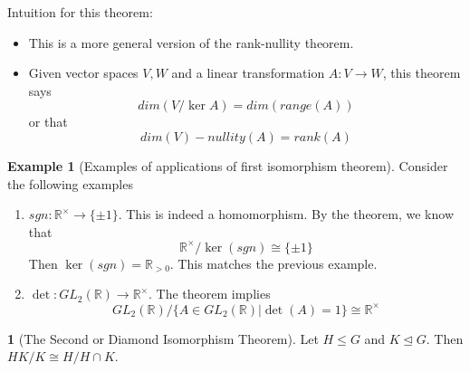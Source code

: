 \documentclass[12pt]{article}
\theoremstyle{definition}
\newtheorem{theorem}{\color{ForestGreen}{\textbf{Theorem}}}
\newcommand{\R}{\mathbb{R}}
\newtheorem{example}{\color{WildStrawberry}Example}
\theoremstyle{definition}
\begin{document}
Intuition for this theorem:
\begin{itemize}
	\item This is a more general version of the rank-nullity theorem.
	\item Given vector spaces $V, W$ and a linear transformation $A : V \to W$, this theorem says
	\begin{equation}
		dim( V / \ker A ) = dim (range(A))
	\end{equation}
	or that
	\begin{equation}
		dim(V) - nullity(A) = rank(A)
	\end{equation}
\end{itemize}

\begin{example}[Examples of applications of first isomorphism theorem] Consider the following examples
\begin{enumerate}
	\item $sgn : \R^{\times} \to \{\pm 1 \}$. This is indeed a homomorphism. By the theorem, we know that
	\begin{equation}
		\R^{\times} /\ker(sgn) \cong \{ \pm 1\}
	\end{equation}
	Then $\ker(sgn) = \R_{>0}$. This matches the previous example. 
	\item $\det : GL_2(\mathbb{R}) \to \R^{\times}$. The theorem implies
	\begin{equation}
		GL_2(\mathbb{R}) / \{A \in GL_2(\mathbb{R}) | \det(A) = 1 \} \cong \R^{\times}
	\end{equation}
\end{enumerate}

\end{example}

\begin{theorem}[The Second or Diamond Isomorphism Theorem]
Let $H \leq G$ and $K \trianglelefteq G$. Then $HK / K \cong H / H \cap K$. 
\end{theorem}
\end{document}
